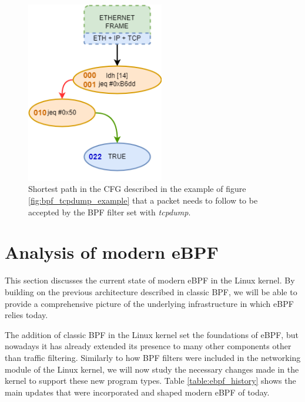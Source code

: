 \documentclass[12pt]{report} %
\begin{document}
\begin{figure}[H]
	\centering
	\includegraphics[width=6cm]{cBPF_prog_ex_sol.png}
	\caption{Shortest path in the CFG described in the example of figure \ref{fig:bpf_tcpdump_example} that a packet needs to follow to be accepted by the BPF filter set with \textit{tcpdump}.}
	\label{fig:tcpdump_ex_sol}
\end{figure}

\section{Analysis of modern eBPF} \label{section:modern_ebpf}
This section discusses the current state of modern eBPF in the Linux kernel. By building on the previous architecture described in classic BPF, we will be able to provide a comprehensive picture of the underlying infrastructure in which eBPF relies today.

The addition of classic BPF in the Linux kernel set the foundations of eBPF, but nowadays it has already extended its presence to many other components other than traffic filtering. Similarly to how BPF filters were included in the networking module of the Linux kernel, we will now study the necessary changes made in the kernel to support these new program types. Table \ref{table:ebpf_history} shows the main updates that were incorporated and shaped modern eBPF of today.
\end{document}
